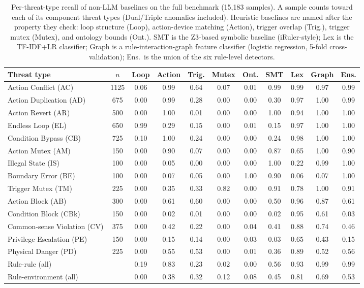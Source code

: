 \begin{table}[p]
\centering
\small
\caption{Per-threat-type recall of non-LLM baselines on the full benchmark (15,183 samples). A sample counts toward each of its component threat types (Dual/Triple anomalies included). Heuristic baselines are named after the property they check: loop structure (Loop), action-device matching (Action), trigger overlap (Trig.), trigger mutex (Mutex), and ontology bounds (Ont.). SMT is the Z3-based symbolic baseline (iRuler-style); Lex is the TF-IDF+LR classifier; Graph is a rule-interaction-graph feature classifier (logistic regression, 5-fold cross-validation); Ens.\ is the union of the six rule-level detectors.}
\label{tab:appendixbaselines}
\setlength{\tabcolsep}{4pt}
\begin{tabular}{lcccccccccc}
\hline
Threat type & $n$ & Loop & Action & Trig. & Mutex & Ont. & SMT & Lex & Graph & Ens. \\
\hline
Action Conflict (AC) & 1125 & 0.06 & 0.99 & 0.64 & 0.07 & 0.01 & 0.99 & 0.99 & 0.97 & 0.99 \\
Action Duplication (AD) & 675 & 0.00 & 0.99 & 0.28 & 0.00 & 0.00 & 0.30 & 0.97 & 1.00 & 0.99 \\
Action Revert (AR) & 500 & 0.00 & 1.00 & 0.01 & 0.00 & 0.00 & 1.00 & 0.94 & 1.00 & 1.00 \\
Endless Loop (EL) & 650 & 0.99 & 0.29 & 0.15 & 0.00 & 0.01 & 0.15 & 0.97 & 1.00 & 1.00 \\
Condition Bypass (CB) & 725 & 0.10 & 1.00 & 0.24 & 0.00 & 0.00 & 0.24 & 0.98 & 1.00 & 1.00 \\
Action Mutex (AM) & 150 & 0.00 & 0.90 & 0.07 & 0.00 & 0.00 & 0.87 & 0.65 & 1.00 & 0.90 \\
Illegal State (IS) & 100 & 0.00 & 0.05 & 0.00 & 0.00 & 0.00 & 1.00 & 0.22 & 0.99 & 1.00 \\
Boundary Error (BE) & 100 & 0.00 & 0.07 & 0.05 & 0.00 & 1.00 & 0.90 & 0.06 & 0.07 & 1.00 \\
Trigger Mutex (TM) & 225 & 0.00 & 0.35 & 0.33 & 0.82 & 0.00 & 0.91 & 0.78 & 1.00 & 0.91 \\
Action Block (AB) & 300 & 0.00 & 0.61 & 0.60 & 0.00 & 0.00 & 0.50 & 0.96 & 0.87 & 0.61 \\
Condition Block (CBk) & 150 & 0.00 & 0.02 & 0.01 & 0.00 & 0.00 & 0.02 & 0.95 & 0.61 & 0.03 \\
Common-sense Violation (CV) & 375 & 0.00 & 0.42 & 0.22 & 0.00 & 0.04 & 0.41 & 0.88 & 0.74 & 0.46 \\
Privilege Escalation (PE) & 150 & 0.00 & 0.15 & 0.14 & 0.00 & 0.03 & 0.03 & 0.65 & 0.43 & 0.15 \\
Physical Danger (PD) & 225 & 0.00 & 0.55 & 0.53 & 0.00 & 0.01 & 0.36 & 0.89 & 0.52 & 0.56 \\
\hline
Rule-rule (all) &  & 0.19 & 0.83 & 0.23 & 0.02 & 0.00 & 0.56 & 0.93 & 0.99 & 0.99 \\
Rule-environment (all) &  & 0.00 & 0.38 & 0.32 & 0.12 & 0.08 & 0.45 & 0.81 & 0.69 & 0.53 \\
\hline
\end{tabular}
\end{table}
